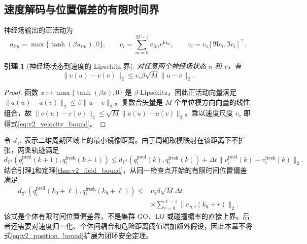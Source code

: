 \documentclass[UTF8,fontset=windows,11pt]{ctexart}
\newtheorem{lemma}[theorem]{引理}
\newcommand{\Ttwo}{\mathbb T^2}
\begin{document}
\subsection{速度解码与位置偏差的有限时间界}

神经场输出的正活动为
\begin{equation}
 a_{im}=\max\{\tanh(\beta u_{im}),0\},
 \qquad
 c_i=\sum_{m=0}^{M-1}a_{im}e^{\mathrm i\alpha_m},
 \qquad
 v_i=v_s[\Re c_i,\Im c_i]^{\top}.
 \label{eq:v2_velocity_decode}
\end{equation}

\begin{lemma}[神经场状态到速度的 Lipschitz 界]
\label{lem:v2_velocity_bound}
对任意两个神经场状态 $u$ 和 $v$，有
\begin{equation}
 \|v(u)-v(v)\|_2
 \le v_s\beta\sqrt M\|u-v\|_2.
 \label{eq:v2_velocity_bound}
\end{equation}
\end{lemma}

\begin{proof}
函数 $x\mapsto\max\{\tanh(\beta x),0\}$ 是 $\beta$-Lipschitz，因此正活动向量满足
\(\|a(u)-a(v)\|_2\le\beta\|u-v\|_2\)。复数合矢量是 $M$ 个单位模方向向量的线性组合，故
\(\|c(u)-c(v)\|_2\le\sqrt M\|a(u)-a(v)\|_2\)。乘以速度尺度 $v_s$ 即得式\eqref{eq:v2_velocity_bound}。
\end{proof}

令 $d_{\Ttwo}$ 表示二维周期区域上的最小镜像距离。由于周期取模映射在该距离下不扩张，两条轨迹满足
\begin{equation}
 d_{\Ttwo}(q_i^{\mathrm{pred}}(k+1),q_i^{\mathrm{fresh}}(k+1))
 \le d_{\Ttwo}(q_i^{\mathrm{pred}}(k),q_i^{\mathrm{fresh}}(k))
 +\Delta t\|v_i^{\mathrm{pred}}(k)-v_i^{\mathrm{fresh}}(k)\|_2.
 \label{eq:v2_position_step}
\end{equation}
结合引理\ref{lem:v2_velocity_bound}和定理\ref{thm:v2_field_bound}，从同一检查点开始的有限时间位置偏差满足
\begin{equation}
 \begin{aligned}
 d_{\Ttwo}(q_i^{\mathrm{pred}}(k_0+\ell),q_i^{\mathrm{fresh}}(k_0+\ell))
 \le{}&v_s\beta\sqrt M\Delta t\\
 &\times\sum_{r=0}^{\ell-1}\|e_{u,i}(k_0+r)\|_2.
 \end{aligned}
 \label{eq:v2_position_bound}
\end{equation}
该式是个体有限时间位置偏差界，不是集群 GO、LO 或碰撞概率的直接上界。后者还需要对速度归一化、个体间耦合和危险距离阈值增加额外假设，因此本章不将式\eqref{eq:v2_position_bound}扩展为闭环安全定理。
\end{document}

